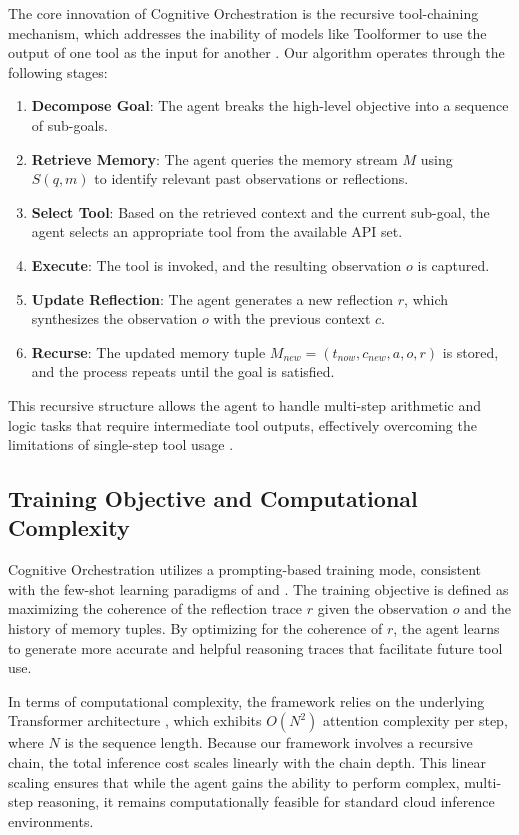 \documentclass[11pt,a4paper]{article}
\begin{document}
The core innovation of Cognitive Orchestration is the recursive tool-chaining mechanism, which addresses the inability of models like Toolformer to use the output of one tool as the input for another \cite{schick2023}. Our algorithm operates through the following stages:

\begin{enumerate}
\item \textbf{Decompose Goal}: The agent breaks the high-level objective into a sequence of sub-goals.
\item \textbf{Retrieve Memory}: The agent queries the memory stream $M$ using $S(q, m)$ to identify relevant past observations or reflections.
\item \textbf{Select Tool}: Based on the retrieved context and the current sub-goal, the agent selects an appropriate tool from the available API set.
\item \textbf{Execute}: The tool is invoked, and the resulting observation $o$ is captured.
\item \textbf{Update Reflection}: The agent generates a new reflection $r$, which synthesizes the observation $o$ with the previous context $c$.
\item \textbf{Recurse}: The updated memory tuple $M_{new} = (t_{now}, c_{new}, a, o, r)$ is stored, and the process repeats until the goal is satisfied.
\end{enumerate}

This recursive structure allows the agent to handle multi-step arithmetic and logic tasks that require intermediate tool outputs, effectively overcoming the limitations of single-step tool usage \cite{schick2023}.

\subsection{Training Objective and Computational Complexity}

Cognitive Orchestration utilizes a prompting-based training mode, consistent with the few-shot learning paradigms of \cite{wei2022} and \cite{yao2023}. The training objective is defined as maximizing the coherence of the reflection trace $r$ given the observation $o$ and the history of memory tuples. By optimizing for the coherence of $r$, the agent learns to generate more accurate and helpful reasoning traces that facilitate future tool use.

In terms of computational complexity, the framework relies on the underlying Transformer architecture \cite{vaswani2017}, which exhibits $O(N^2)$ attention complexity per step, where $N$ is the sequence length. Because our framework involves a recursive chain, the total inference cost scales linearly with the chain depth. This linear scaling ensures that while the agent gains the ability to perform complex, multi-step reasoning, it remains computationally feasible for standard cloud inference environments.
\end{document}
